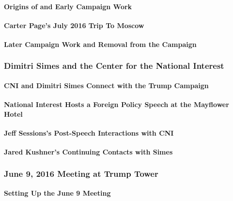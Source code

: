 \paragraph{Origins of and Early Campaign Work}

\paragraph{Carter Page's July 2016 Trip To Moscow}

\paragraph{Later Campaign Work and Removal from the Campaign}

\subsubsection{Dimitri Simes and the Center for the National Interest}

\paragraph{CNI and Dimitri Simes Connect with the Trump Campaign}

\paragraph{National Interest Hosts a Foreign Policy Speech at the Mayflower Hotel}

\paragraph{Jeff Sessions's Post-Speech Interactions with CNI}

\paragraph{Jared Kushner's Continuing Contacts with Simes}

\subsubsection{June 9, 2016 Meeting at Trump Tower}

\paragraph{Setting Up the June 9 Meeting}

